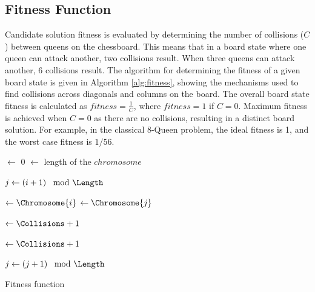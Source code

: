 \documentclass[conference]{IEEEtran}
\begin{document}
\subsection{Fitness Function}
Candidate solution fitness is evaluated by determining the number of collisions ($C$) between queens on the chessboard. This means that in a board state where one queen can attack another, two collisions result. When three queens can attack another, 6 collisions result. The algorithm for determining the fitness of a given board state is given in Algorithm \ref{alg:fitness}, showing the mechanisms used to find collisions across diagonals and columns on the board. The overall board state fitness is calculated as $fitness = \frac{1}{C}$, where $fitness = 1$ if $C = 0$. Maximum fitness is achieved when $C = 0$ as there are no collisions, resulting in a distinct board solution. For example, in the classical 8-Queen problem, the ideal fitness is 1, and the worst case fitness is $1/56$.
 
\begin{algorithm}[t!]
  \SetAlgoLined
  \DontPrintSemicolon
  
  {
    \BlankLine
    
    \Collisions $\leftarrow$ 0\;
    \Length $\leftarrow$ length of the $chromosome$\;
    \BlankLine
    
    {
      $j \leftarrow \left( i + 1 \right) \mod{\Length}$\;
      {
        \Yi $\leftarrow \Chromosome{i}$\;
        \Yj $\leftarrow \Chromosome{j}$\;
        \BlankLine
        
        \If{\Yi == \Yj}
        {
          \Collisions $\leftarrow \Collisions + 1$\; 
        }
        \BlankLine
        
        {
          \Collisions $\leftarrow \Collisions + 1$\;
        }
        \BlankLine
        
        $j \leftarrow \left(j + 1 \right) \mod{\Length}$\;
      }
    }
    \BlankLine

    {
      \;
    }
    {
      \;
    }
  }
\caption{Fitness function}
\label{alg:fitness}
\end{algorithm}
\end{document}
